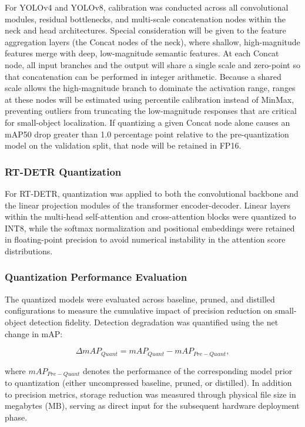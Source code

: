 For YOLOv4 and YOLOv8, calibration was conducted across all convolutional modules, residual bottlenecks, and multi-scale concatenation nodes within the neck and head architectures. Special consideration will be given to the feature aggregation layers (the Concat nodes of the neck), where shallow, high-magnitude features merge with deep, low-magnitude semantic features. At each Concat node, all input branches and the output will share a single scale and zero-point so that concatenation can be performed in integer arithmetic. Because a shared scale allows the high-magnitude branch to dominate the activation range, ranges at these nodes will be estimated using percentile calibration instead of MinMax, preventing outliers from truncating the low-magnitude responses that are critical for small-object localization. If quantizing a given Concat node alone causes an mAP50 drop greater than 1.0 percentage point relative to the pre-quantization model on the validation split, that node will be retained in FP16.

\subsubsection{RT-DETR Quantization}

For RT-DETR, quantization was applied to both the convolutional backbone and the linear projection modules of the transformer encoder-decoder. Linear layers within the multi-head self-attention and cross-attention blocks were quantized to $\text{INT8}$, while the softmax normalization and positional embeddings were retained in floating-point precision to avoid numerical instability in the attention score distributions.

\subsubsection{Quantization Performance Evaluation}

The quantized models were evaluated across baseline, pruned, and distilled configurations to measure the cumulative impact of precision reduction on small-object detection fidelity. Detection degradation was quantified using the net change in $\text{mAP}$:

$$
\Delta mAP_{Quant} = mAP_{Quant} - mAP_{Pre-Quant},
$$

where $mAP_{Pre-Quant}$ denotes the performance of the corresponding model prior to quantization (either uncompressed baseline, pruned, or distilled). In addition to precision metrics, storage reduction was measured through physical file size in megabytes ($\text{MB}$), serving as direct input for the subsequent hardware deployment phase.

